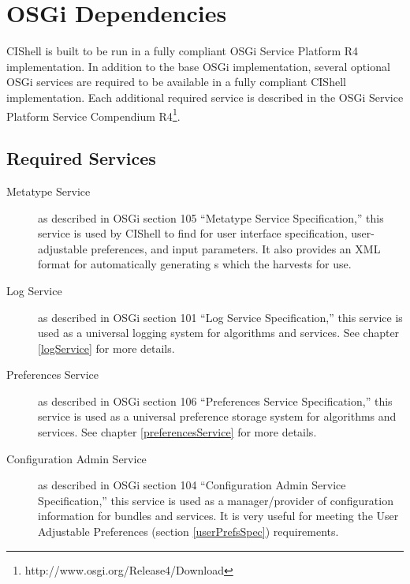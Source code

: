 %

\section{OSGi Dependencies}

CIShell is built to be run in a fully compliant OSGi Service Platform R4
implementation. In addition to the base OSGi implementation, several
optional OSGi services are required to be available in a fully compliant CIShell
implementation. Each additional required service is described in the OSGi
Service Platform Service Compendium
R4\footnote{http://www.osgi.org/Release4/Download}.

\subsection*{Required Services}
\begin{description}
  \item[Metatype Service] as described in OSGi section 105 ``Metatype Service
  Specification,'' this service is used by CIShell to find
   for user interface specification, user-adjustable
  preferences, and input parameters. It also provides an XML format for
  automatically generating s which the 
   harvests for use.
  \item[Log Service] as described in OSGi section 101 ``Log Service 
  Specification,'' this service is used as a universal logging system for 
  algorithms and services. See chapter \ref{logService} for more details.   
  \item[Preferences Service] as described in OSGi section 106 ``Preferences
  Service Specification,'' this service is used as a universal preference
  storage system for algorithms and services. See chapter \ref{preferencesService} for
  more details.
  \item[Configuration Admin Service] as described in OSGi section 104
  ``Configuration Admin Service Specification,'' this service is used as a
  manager/provider of configuration information for bundles and services. It is 
  very useful for meeting the User Adjustable Preferences (section
  \ref{userPrefsSpec}) requirements.
\end{description}

